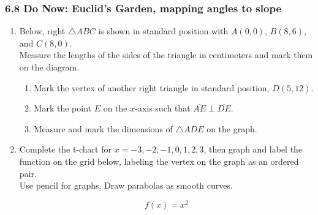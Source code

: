 \documentclass[12pt, twoside]{article}
\begin{document}
\subsubsection*{6.8 Do Now: Euclid's Garden, mapping angles to slope}
  \begin{enumerate}

    \item Below, right $\triangle ABC$ is shown in standard position with $A(0, 0)$, $B(8, 6)$, and $C(8,0)$.\\[0.25cm]
     Measure the lengths of the sides of the triangle in centimeters and mark them on the diagram.
    \begin{center}
    \end{center}
      \vspace{1cm}
    \begin{enumerate}
      \item Mark the vertex of another right triangle in standard position, $D(5,12)$.
      \item Mark the point $E$ on the $x$-axis such that $\overline{AE} \perp \overline{DE}$.
      \item Measure and mark the dimensions of $\triangle ADE$ on the graph.
    \end{enumerate}

\newpage 
  \item Complete the t-chart for $x= -3,-2,-1,0,1,2,3$, then graph and label the function on the grid below, labeling the vertex on the graph as an ordered pair.\\[0.25cm]
  Use pencil for graphs. Draw parabolas as smooth curves.

  \[f(x) = x^2\]


\end{enumerate}
\end{document}
